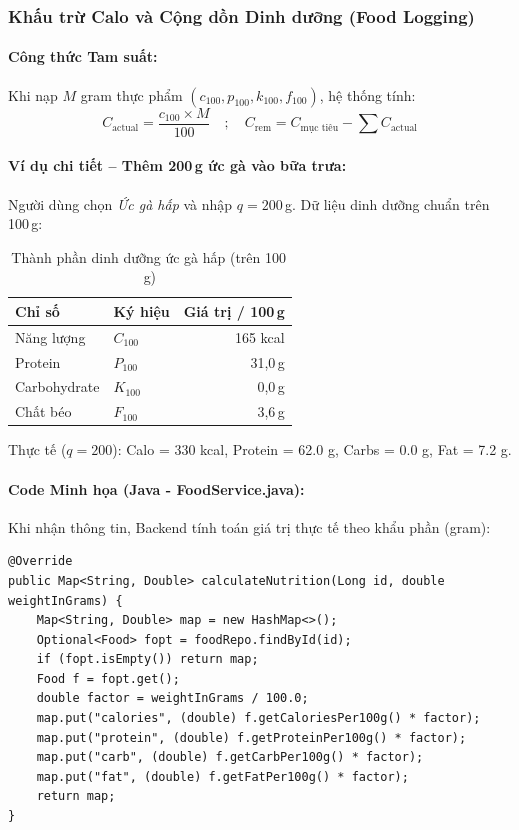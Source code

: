 \documentclass[12pt,a4paper]{article}
\begin{document}
\subsubsection{Khấu trừ Calo và Cộng dồn Dinh dưỡng (Food Logging)}

\paragraph{Công thức Tam suất:}
Khi nạp $M$ gram thực phẩm $(c_{100}, p_{100}, k_{100}, f_{100})$, hệ thống tính:
\begin{equation}
    C_{\text{actual}} = \frac{c_{100} \times M}{100} \quad ; \quad
    C_{\text{rem}} = C_{\text{mục tiêu}} - \sum C_{\text{actual}}
\end{equation}

\paragraph{Ví dụ chi tiết -- Thêm 200\,g ức gà vào bữa trưa:}
Người dùng chọn \emph{Ức gà hấp} và nhập $q = 200$\,g. Dữ liệu dinh dưỡng chuẩn trên 100\,g:
\begin{table}[H]
    \centering
    \caption{Thành phần dinh dưỡng ức gà hấp (trên 100\,g)}
    \label{tab:chicken_nutrition}
    \begin{tabularx}{0.65\textwidth}{lXr}
        \toprule
        \textbf{Chỉ số} & \textbf{Ký hiệu} & \textbf{Giá trị / 100\,g} \\
        \midrule
        Năng lượng   & $C_{100}$ & 165 kcal \\
        Protein      & $P_{100}$ & 31{,}0\,g \\
        Carbohydrate & $K_{100}$ & 0{,}0\,g  \\
        Chất béo     & $F_{100}$ & 3{,}6\,g  \\
        \bottomrule
    \end{tabularx}
\end{table}

Thực tế ($q=200$): Calo = 330 kcal, Protein = 62.0 g, Carbs = 0.0 g, Fat = 7.2 g.

\paragraph{Code Minh họa (Java - FoodService.java):}
Khi nhận thông tin, Backend tính toán giá trị thực tế theo khẩu phần (gram):
\begin{verbatim}
@Override
public Map<String, Double> calculateNutrition(Long id, double weightInGrams) {
    Map<String, Double> map = new HashMap<>();
    Optional<Food> fopt = foodRepo.findById(id);
    if (fopt.isEmpty()) return map;
    Food f = fopt.get();
    double factor = weightInGrams / 100.0;
    map.put("calories", (double) f.getCaloriesPer100g() * factor);
    map.put("protein", (double) f.getProteinPer100g() * factor);
    map.put("carb", (double) f.getCarbPer100g() * factor);
    map.put("fat", (double) f.getFatPer100g() * factor);
    return map;
}
\end{verbatim}
\end{document}
